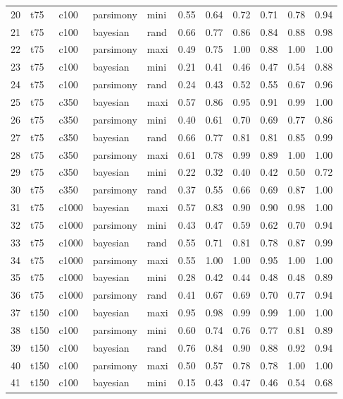 \documentclass[12pt,letterpaper]{article}
\begin{document}
\begin{longtable}{rllllrrrrrr}
  20 & t75 & c100 & parsimony & mini & 0.55 & 0.64 & 0.72 & 0.71 & 0.78 & 0.94 \\ 
  21 & t75 & c100 & bayesian & rand & 0.66 & 0.77 & 0.86 & 0.84 & 0.88 & 0.98 \\ 
  22 & t75 & c100 & parsimony & maxi & 0.49 & 0.75 & 1.00 & 0.88 & 1.00 & 1.00 \\ 
  23 & t75 & c100 & bayesian & mini & 0.21 & 0.41 & 0.46 & 0.47 & 0.54 & 0.88 \\ 
  24 & t75 & c100 & parsimony & rand & 0.24 & 0.43 & 0.52 & 0.55 & 0.67 & 0.96 \\ 
  25 & t75 & c350 & bayesian & maxi & 0.57 & 0.86 & 0.95 & 0.91 & 0.99 & 1.00 \\ 
  26 & t75 & c350 & parsimony & mini & 0.40 & 0.61 & 0.70 & 0.69 & 0.77 & 0.86 \\ 
  27 & t75 & c350 & bayesian & rand & 0.66 & 0.77 & 0.81 & 0.81 & 0.85 & 0.99 \\ 
  28 & t75 & c350 & parsimony & maxi & 0.61 & 0.78 & 0.99 & 0.89 & 1.00 & 1.00 \\ 
  29 & t75 & c350 & bayesian & mini & 0.22 & 0.32 & 0.40 & 0.42 & 0.50 & 0.72 \\ 
  30 & t75 & c350 & parsimony & rand & 0.37 & 0.55 & 0.66 & 0.69 & 0.87 & 1.00 \\ 
  31 & t75 & c1000 & bayesian & maxi & 0.57 & 0.83 & 0.90 & 0.90 & 0.98 & 1.00 \\ 
  32 & t75 & c1000 & parsimony & mini & 0.43 & 0.47 & 0.59 & 0.62 & 0.70 & 0.94 \\ 
  33 & t75 & c1000 & bayesian & rand & 0.55 & 0.71 & 0.81 & 0.78 & 0.87 & 0.99 \\ 
  34 & t75 & c1000 & parsimony & maxi & 0.55 & 1.00 & 1.00 & 0.95 & 1.00 & 1.00 \\ 
  35 & t75 & c1000 & bayesian & mini & 0.28 & 0.42 & 0.44 & 0.48 & 0.48 & 0.89 \\ 
  36 & t75 & c1000 & parsimony & rand & 0.41 & 0.67 & 0.69 & 0.70 & 0.77 & 0.94 \\ 
  37 & t150 & c100 & bayesian & maxi & 0.95 & 0.98 & 0.99 & 0.99 & 1.00 & 1.00 \\ 
  38 & t150 & c100 & parsimony & mini & 0.60 & 0.74 & 0.76 & 0.77 & 0.81 & 0.89 \\ 
  39 & t150 & c100 & bayesian & rand & 0.76 & 0.84 & 0.90 & 0.88 & 0.92 & 0.94 \\ 
  40 & t150 & c100 & parsimony & maxi & 0.50 & 0.57 & 0.78 & 0.78 & 1.00 & 1.00 \\ 
  41 & t150 & c100 & bayesian & mini & 0.15 & 0.43 & 0.47 & 0.46 & 0.54 & 0.68 \\ 

\end{longtable}
\end{document}
